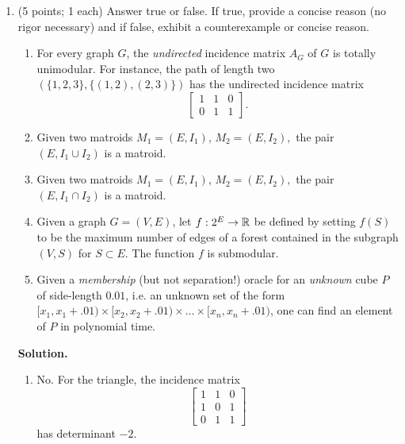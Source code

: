 \documentclass[12pt]{article}
\begin{document}
\begin{enumerate}
\item (5 points; 1 each) Answer true or false. If true, provide a concise reason (no rigor necessary) and if false, exhibit a counterexample or concise reason.
\begin{enumerate}
\item For every graph $G$, the \emph{undirected} incidence matrix $A_G$ of $G$ is totally unimodular. For instance, the path of length two $(\{1,2,3\}, \{(1,2), (2,3)\})$ has the undirected incidence matrix
$$ \begin{bmatrix}
1 & 1 & 0 \\
0 & 1 & 1
\end{bmatrix}. $$
\item Given two matroids $M_1 = (E, I_1)$, $M_2 = (E, I_2),$ the pair $(E, I_1 \cup I_2)$ is a matroid.
\item Given two matroids $M_1 = (E, I_1)$, $M_2 = (E, I_2),$ the pair $(E, I_1 \cap I_2)$ is a matroid.
\item Given a graph $G = (V, E)$, let $f:2^E \to {\mathbb R}$ be defined by setting $f(S)$ to be the maximum number of edges of a forest contained in the subgraph $(V, S)$ for $S \subset E$. The function $f$ is submodular.
\item Given a \emph{membership} (but not separation!) oracle for an \emph{unknown} cube $P$ of side-length $0.01$, i.e. an unknown set of the form $[x_1 , x_1 + .01)\times [x_2, x_2 + .01) \times \dots \times [x_n, x_n + .01)$, one can find an element of $P$ in polynomial time. \end{enumerate}

\textbf{Solution.}

\begin{enumerate}
\item No. For the triangle, the incidence matrix
$$ \begin{bmatrix}
1 & 1 & 0 \\
1 & 0 & 1 \\
0 & 1 & 1
\end{bmatrix} $$
has determinant $-2$.


\end{enumerate}
\end{enumerate}
\end{document}

